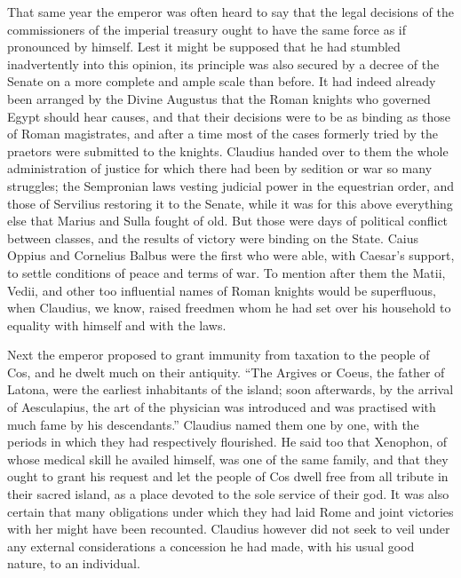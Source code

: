 
That same year the emperor was often heard to say that the legal decisions of the commissioners of the imperial treasury ought to have the same force as if pronounced by himself. Lest it might be supposed that he had stumbled inadvertently into this opinion, its principle was also secured by a decree of the Senate on a more complete and ample scale than before. It had indeed already been arranged by the Divine Augustus that the Roman knights who governed Egypt should hear causes, and that their decisions were to be as binding as those of Roman magistrates, and after a time most of the cases formerly tried by the praetors were submitted to the knights. Claudius handed over to them the whole administration of justice for which there had been by sedition or war so many struggles; the Sempronian laws vesting judicial power in the equestrian order, and those of Servilius restoring it to the Senate, while it was for this above everything else that Marius and Sulla fought of old. But those were days of political conflict between classes, and the results of victory were binding on the State. Caius Oppius and Cornelius Balbus were the first who were able, with Caesar's support, to settle conditions of peace and terms of war. To mention after them the Matii, Vedii, and other too influential names of Roman knights would be superfluous, when Claudius, we know, raised freedmen whom he had set over his household to equality with himself and with the laws.


Next the emperor proposed to grant immunity from taxation to the people of Cos, and he dwelt much on their antiquity. ``The Argives or Coeus, the father of Latona, were the earliest inhabitants of the island; soon afterwards, by the arrival of Aesculapius, the art of the physician was introduced and was practised with much fame by his descendants.'' Claudius named them one by one, with the periods in which they had respectively flourished. He said too that Xenophon, of whose medical skill he availed himself, was one of the same family, and that they ought to grant his request and let the people of Cos dwell free from all tribute in their sacred island, as a place devoted to the sole service of their god. It was also certain that many obligations under which they had laid Rome and joint victories with her might have been recounted. Claudius however did not seek to veil under any external considerations a concession he had made, with his usual good nature, to an individual.

